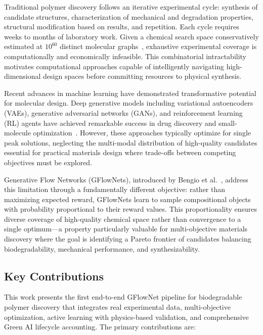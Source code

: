 \documentclass[twocolumn,10pt]{article}
\begin{document}
Traditional polymer discovery follows an iterative experimental cycle: synthesis of candidate structures, characterization of mechanical and degradation properties, structural modification based on results, and repetition. Each cycle requires weeks to months of laboratory work. Given a chemical search space conservatively estimated at $10^{60}$ distinct molecular graphs~\cite{aspuru2018accelerating}, exhaustive experimental coverage is computationally and economically infeasible. This combinatorial intractability motivates computational approaches capable of intelligently navigating high-dimensional design spaces before committing resources to physical synthesis.

Recent advances in machine learning have demonstrated transformative potential for molecular design. Deep generative models including variational autoencoders (VAEs), generative adversarial networks (GANs), and reinforcement learning (RL) agents have achieved remarkable success in drug discovery and small-molecule optimization~\cite{gomez2018automatic,kusner2017grammar}. However, these approaches typically optimize for single peak solutions, neglecting the multi-modal distribution of high-quality candidates essential for practical materials design where trade-offs between competing objectives must be explored.

Generative Flow Networks (GFlowNets), introduced by Bengio et al.~\cite{bengio2021flow}, address this limitation through a fundamentally different objective: rather than maximizing expected reward, GFlowNets learn to sample compositional objects with probability proportional to their reward values. This proportionality ensures diverse coverage of high-quality chemical space rather than convergence to a single optimum—a property particularly valuable for multi-objective materials discovery where the goal is identifying a Pareto frontier of candidates balancing biodegradability, mechanical performance, and synthesizability.

\subsection{Key Contributions}

This work presents the first end-to-end GFlowNet pipeline for biodegradable polymer discovery that integrates real experimental data, multi-objective optimization, active learning with physics-based validation, and comprehensive Green AI lifecycle accounting. The primary contributions are:
\end{document}

